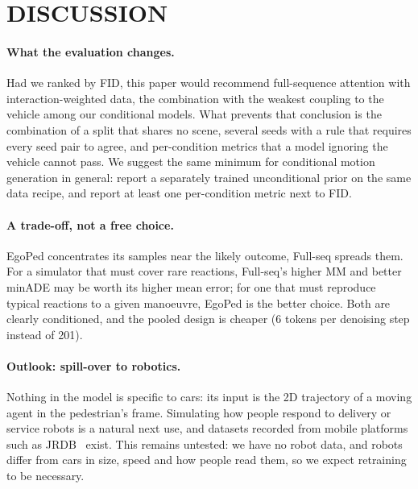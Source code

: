 \documentclass{ieeeoj}
\newcommand{\method}{EgoPed\xspace}
\newcommand{\fullseq}{Full-seq\xspace}
\begin{document}
\section{DISCUSSION}
\label{sec:discussion}

\paragraph{What the evaluation changes.}
Had we ranked by FID, this paper would recommend full-sequence attention with interaction-weighted data, the combination with the weakest coupling to the vehicle among our conditional models. What prevents that conclusion is the combination of a split that shares no scene, several seeds with a rule that requires every seed pair to agree, and per-condition metrics that a model ignoring the vehicle cannot pass. We suggest the same minimum for conditional motion generation in general: report a separately trained unconditional prior on the same data recipe, and report at least one per-condition metric next to FID.

\paragraph{A trade-off, not a free choice.}
\method concentrates its samples near the likely outcome, \fullseq spreads them. For a simulator that must cover rare reactions, \fullseq's higher MM and better minADE may be worth its higher mean error; for one that must reproduce typical reactions to a given manoeuvre, \method is the better choice. Both are clearly conditioned, and the pooled design is cheaper (6 tokens per denoising step instead of 201).

\paragraph{Outlook: spill-over to robotics.}
Nothing in the model is specific to cars: its input is the 2D trajectory of a moving agent in the pedestrian's frame. Simulating how people respond to delivery or service robots is a natural next use, and datasets recorded from mobile platforms such as JRDB~\cite{martinmartin2023jrdb} exist. This remains untested: we have no robot data, and robots differ from cars in size, speed and how people read them, so we expect retraining to be necessary.
\end{document}
